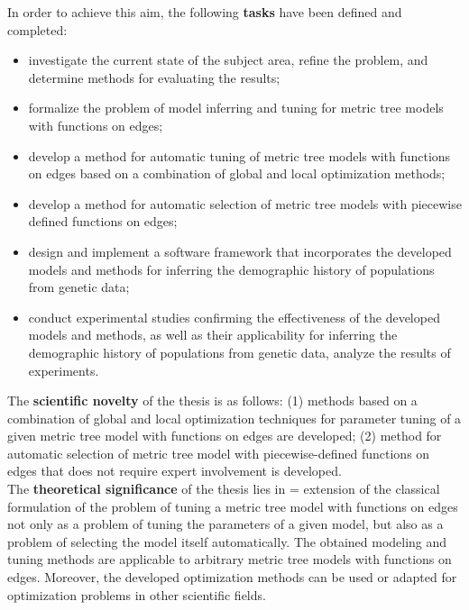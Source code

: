In order to achieve this aim, the following \textbf{tasks} have been defined and completed:
\begin{itemize}
    \item investigate the current state of the subject area, refine the problem, and determine methods for evaluating the results;
    \item formalize the problem of model inferring and tuning for metric tree models with functions on edges;
    \item develop a method for automatic tuning of metric tree models with functions on edges based on a combination of global and local optimization methods;
    \item develop a method for automatic selection of metric tree models with piecewise defined functions on edges;
    \item design and implement a software framework that incorporates the developed models and methods for inferring the demographic history of populations from genetic data;
    \item conduct experimental studies confirming the effectiveness of the developed models and methods, as well as their applicability for inferring the demographic history of populations from genetic data, analyze the results of experiments.\\
\end{itemize}

The \textbf{scientific novelty} of the thesis is as follows:
(1) methods based on a combination of global and local optimization techniques for parameter tuning of a given metric tree model with functions on edges are developed;
(2) method for automatic selection of metric tree model with piecewise-defined functions on edges that does not require expert involvement is developed.\\

The \textbf{theoretical significance} of the thesis lies in = extension of the classical formulation of the problem of tuning a metric tree model with functions on edges not only as a problem of tuning the parameters of a given model, but also as a problem of selecting the model itself automatically.
The obtained modeling and tuning methods are applicable to arbitrary metric tree models with functions on edges.
Moreover, the developed optimization methods can be used or adapted for optimization problems in other scientific fields.\\

